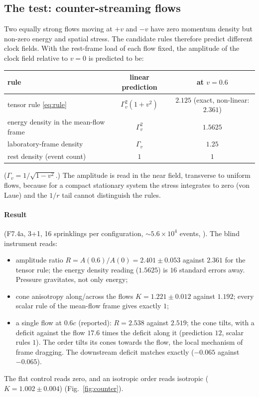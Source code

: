 \subsection{The test: counter-streaming flows}

Two equally strong flows moving at $+v$ and $-v$ have zero momentum density but non-zero energy and
spatial stress. The candidate rules therefore predict different clock fields. With the rest-frame load
of each flow fixed, the amplitude of the clock field relative to $v=0$ is predicted to be:
\begin{center}
\begin{tabular}{lcc}
\toprule
rule & linear prediction & at $v=0.6$\\
\midrule
tensor rule \eqref{eq:rule} & $\Gamma_v^2(1+v^2)$ & $2.125$ (exact, non-linear: $2.361$)\\
energy density in the mean-flow frame & $\Gamma_v^2$ & $1.5625$\\
laboratory-frame density & $\Gamma_v$ & $1.25$\\
rest density (event count) & $1$ & $1$\\
\bottomrule
\end{tabular}
\end{center}
($\Gamma_v=1/\sqrt{1-v^2}$.) The amplitude is read in the near field, transverse to uniform flows, because
for a compact stationary system the stress integrates to zero (von Laue) and the $1/r$ tail cannot
distinguish the rules.

\paragraph{Result} (F7.4a, 3+1, 16 sprinklings per configuration, $\sim5.6\times10^4$ events,
). The blind instrument reads:
\begin{itemize}
\item amplitude ratio $R=A(0.6)/A(0)=2.401\pm0.053$ against $2.361$ for the tensor rule; the energy
  density reading ($1.5625$) is $16$ standard errors away. Pressure gravitates, not only energy;
\item cone anisotropy along/across the flows $K=1.221\pm0.012$ against $1.192$; every scalar rule of the
  mean-flow frame gives exactly $1$;
\item a single flow at $0.6c$ (reported): $R=2.538$ against $2.519$; the cone tilts, with a deficit
  against the flow $17.6$ times the deficit along it (prediction $12$, scalar rules $1$). The order tilts
  its cones towards the flow, the local mechanism of frame dragging. The downstream deficit matches exactly ($-0.065$ against $-0.065$).
\end{itemize}
The flat control reads zero, and an isotropic order reads isotropic ($K=1.002\pm0.004$)
(Fig.~\ref{fig:counter}).

